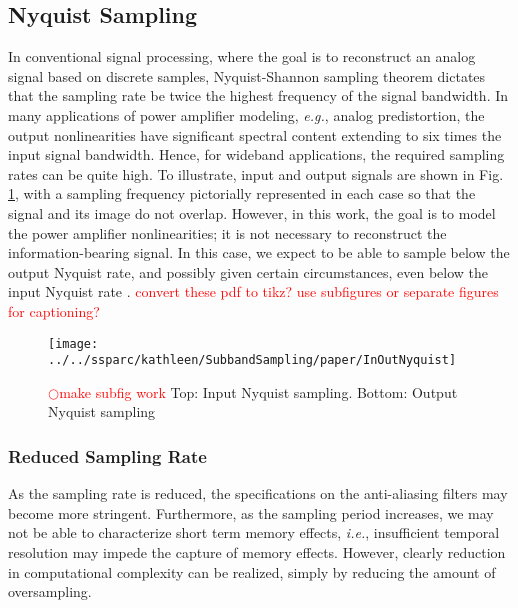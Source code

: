 \documentclass[11pt,onecolumn]{IEEEtran}
\begin{document}
\subsection{Nyquist Sampling}
In conventional signal processing, where the goal is to reconstruct an analog signal based on discrete samples, Nyquist-Shannon sampling theorem dictates that the sampling rate be twice the highest frequency of the signal bandwidth\cite{Liu96Spec}.  In many applications of power amplifier modeling, \textit{e.g.}, analog predistortion, the output nonlinearities have significant spectral content extending to six times the input signal bandwidth\cite{Park02Adap}.  Hence, for wideband applications, the required sampling rates can be quite high.  To illustrate, input and output signals are shown in Fig. \ref{fig_Nyquist}, with a sampling frequency pictorially represented in each case so that the signal and its image do not overlap.  However, in this work, the goal is to model the power amplifier nonlinearities; it is not necessary to reconstruct the information-bearing signal.   In this case, we expect to be able to sample below the output Nyquist rate, and possibly given certain circumstances, even below the input Nyquist rate
\cite{Liu96Spec}\cite{Park02Adap}.  \textcolor{red}{ convert these pdf to tikz?  use subfigures or separate figures for captioning?}
\begin{figure}[t!]   %
\centering
\texttt{[image: ../../ssparc/kathleen/SubbandSampling/paper/InOutNyquist]}
\caption{\textcolor{red} {$\bigcirc$make subfig work}  Top:  Input Nyquist sampling.  Bottom:  Output Nyquist sampling}
\label{fig_Nyquist}
\end{figure}

\subsubsection{Reduced Sampling Rate}
As the sampling rate is reduced, the specifications on the anti-aliasing filters may become more stringent.  Furthermore, as the sampling period increases, we may not be able to characterize short term memory effects, \emph{i.e.}, insufficient temporal resolution may impede the capture of memory effects.  However, clearly reduction in computational complexity can be realized, simply by reducing the amount of oversampling.
\end{document}
